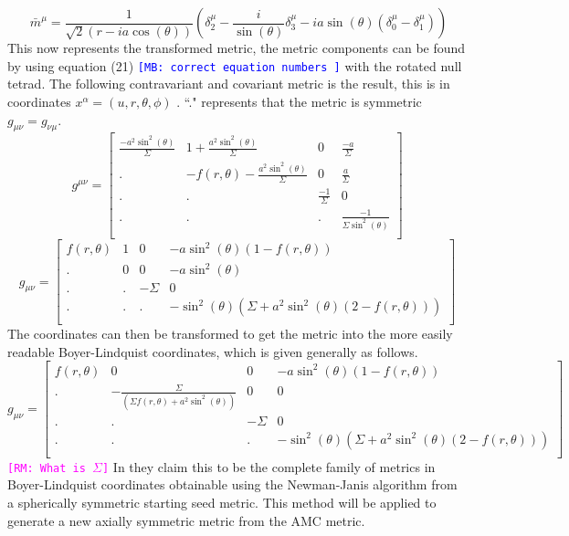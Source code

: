\documentclass[12pt]{iopart}
\def\mbc#1{\textcolor{blue}{\tt[MB: #1]}}
\def\rmc#1{\textcolor{magenta}{\tt[RM: #1]}}
\begin{document}
 \begin{equation} \
 \bar{m}^{\mu}=\frac{1}{\sqrt{2}(r-ia\cos(\theta))}\left(\delta^{\mu}_2-\frac{i}{\sin(\theta)}\delta^{\mu}_3-ia\sin(\theta)(\delta^{\mu}_0-\delta^{\mu}_1)\right)
 \end{equation}
 This now represents the transformed metric, the metric components can be found by using equation (21) \mbc{correct equation numbers } with the rotated null tetrad. The following contravariant and covariant metric is the result, this is in coordinates $x^\alpha = (u,r,\theta , \phi)$ \cite{Drake:1997hh}. ``." represents that the metric is symmetric $g_{\mu \nu}=g_{\nu \mu}$.
\\
\[
g^{\mu \nu}=
  \left[ {\begin{array}{ccccc}
    \frac{-a^2\sin^2(\theta)}{\Sigma} & 1+\frac{a^2\sin^2(\theta)}{\Sigma} & 0 & \frac{-a}{\Sigma}\\
    . & -f(r,\theta)-\frac{a^2\sin^2(\theta)}{\Sigma} & 0 & \frac{a}{\Sigma}\\
    . & . & \frac{-1}{\Sigma} & 0\\
    . & . & . & \frac{-1}{\Sigma \sin^2(\theta)}\\
  \end{array} } \right]
\]
\[
g_{\mu \nu}=
  \left[ {\begin{array}{ccccc}
 f(r,\theta) & 1 & 0 & -a\sin^2(\theta)(1-f(r,\theta))\\
 . & 0 & 0 & -a\sin^2(\theta)\\
 . & . & -\Sigma & 0\\
 . & . & . & -\sin^2(\theta)(\Sigma+a^2\sin^2(\theta)(2-f(r,\theta)))\\
  \end{array} } \right]
\]
 The coordinates can then be transformed to get the metric into the more easily readable Boyer-Lindquist coordinates, which is given generally as follows.
\\
\[
   g_{\mu \nu}=
  \left[ {\begin{array}{ccccc}
 f(r,\theta) & 0 & 0 & -a\sin^2(\theta)(1-f(r,\theta))\\
 . & -\frac{\Sigma}{(\Sigma f(r,\theta)+a^2\sin^2(\theta))} & 0 & 0\\
 . & . & -\Sigma & 0\\
 . & . & . & -\sin^2(\theta)(\Sigma+a^2\sin^2(\theta)(2-f(r,\theta)))\\
  \end{array} } \right]
\]
\rmc{What is $\Sigma$}
 In \cite{Drake:1997hh} they claim this to be the complete family of metrics in Boyer-Lindquist coordinates obtainable using the Newman-Janis algorithm from a spherically symmetric starting seed metric. This method will be applied to generate a new axially symmetric metric from the AMC metric.
\end{document}
